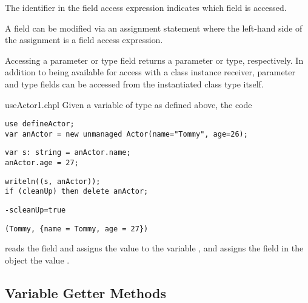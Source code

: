 The identifier in the field access expression indicates which field is accessed.


A field can
be modified via an assignment statement where the left-hand side of
the assignment is a field access expression.

Accessing a parameter or type field returns a parameter or type,
respectively. In addition to being available for access with a class
instance receiver, parameter and type fields can be accessed from the
instantiated class type itself.

\begin{chapelexample}{useActor1.chpl}
Given a variable  of type  as defined above,
the code
\begin{chapelpre}
\begin{verbatim}
use defineActor;
var anActor = new unmanaged Actor(name="Tommy", age=26);
\end{verbatim}
\end{chapelpre}
\begin{chapel}
\begin{verbatim}
var s: string = anActor.name;
anActor.age = 27;
\end{verbatim}
\end{chapel}
\begin{chapelpost}
\begin{verbatim}
writeln((s, anActor));
if (cleanUp) then delete anActor;
\end{verbatim}
\end{chapelpost}
\begin{chapelcompopts}
\begin{verbatim}
-scleanUp=true
\end{verbatim}
\end{chapelcompopts}
\begin{chapeloutput}
\begin{verbatim}
(Tommy, {name = Tommy, age = 27})
\end{verbatim}
\end{chapeloutput}
reads the field  and assigns the value to the variable
, and assigns the field  in the object
 the value .
\end{chapelexample}

\subsection{Variable Getter Methods}
\label{Getter_Methods}

